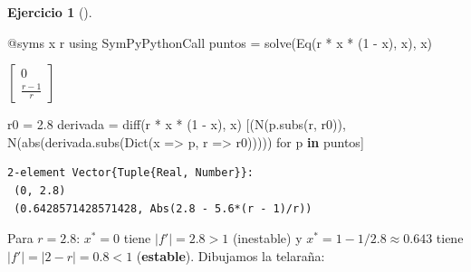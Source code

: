 \documentclass[
  spanish,
  a4paper,
]{scrreport}
\newenvironment{Shaded}{\begin{snugshade}}{\end{snugshade}}
\newcommand{\BuiltInTok}[1]{\textcolor[rgb]{0.00,0.23,0.31}{#1}}
\newcommand{\FloatTok}[1]{\textcolor[rgb]{0.68,0.00,0.00}{#1}}
\newcommand{\FunctionTok}[1]{\textcolor[rgb]{0.28,0.35,0.67}{#1}}
\newcommand{\ImportTok}[1]{\textcolor[rgb]{0.00,0.46,0.62}{#1}}
\newcommand{\KeywordTok}[1]{\textcolor[rgb]{0.00,0.23,0.31}{\textbf{#1}}}
\newcommand{\NormalTok}[1]{\textcolor[rgb]{0.00,0.23,0.31}{#1}}
\newcommand{\OperatorTok}[1]{\textcolor[rgb]{0.37,0.37,0.37}{#1}}
\newcommand{\PreprocessorTok}[1]{\textcolor[rgb]{0.68,0.00,0.00}{#1}}
\theoremstyle{definition}
\newtheorem{exercise}{Ejercicio}[chapter]
\theoremstyle{remark}
\begin{document}
\begin{exercise}[]
\begin{enumerate}
\begin{tcolorbox}
\begin{Shaded}
\begin{Highlighting}[]
\PreprocessorTok{@syms}\NormalTok{ x r}
\ImportTok{using} \BuiltInTok{SymPyPythonCall}
\NormalTok{puntos }\OperatorTok{=} \FunctionTok{solve}\NormalTok{(}\FunctionTok{Eq}\NormalTok{(r }\OperatorTok{*}\NormalTok{ x }\OperatorTok{*}\NormalTok{ (}\FloatTok{1} \OperatorTok{{-}}\NormalTok{ x), x), x)}
\end{Highlighting}
\end{Shaded}

  $\left[\begin{smallmatrix}0\\\frac{r - 1}{r}\end{smallmatrix}\right]$

\begin{Shaded}
\begin{Highlighting}[]
\NormalTok{r0 }\OperatorTok{=} \FloatTok{2.8}
\NormalTok{derivada }\OperatorTok{=} \FunctionTok{diff}\NormalTok{(r }\OperatorTok{*}\NormalTok{ x }\OperatorTok{*}\NormalTok{ (}\FloatTok{1} \OperatorTok{{-}}\NormalTok{ x), x)}
\NormalTok{[(}\FunctionTok{N}\NormalTok{(p.}\FunctionTok{subs}\NormalTok{(r, r0)), }\FunctionTok{N}\NormalTok{(}\FunctionTok{abs}\NormalTok{(derivada.}\FunctionTok{subs}\NormalTok{(}\FunctionTok{Dict}\NormalTok{(x }\OperatorTok{=\textgreater{}}\NormalTok{ p, r }\OperatorTok{=\textgreater{}}\NormalTok{ r0))))) for p }\KeywordTok{in}\NormalTok{ puntos]}
\end{Highlighting}
\end{Shaded}

\begin{verbatim}
2-element Vector{Tuple{Real, Number}}:
 (0, 2.8)
 (0.6428571428571428, Abs(2.8 - 5.6*(r - 1)/r))
\end{verbatim}

  Para \(r=2.8\): \(x^*=0\) tiene \(|f'|=2.8>1\) (inestable) y
  \(x^*=1-1/2.8\approx 0.643\) tiene \(|f'|=|2-r|=0.8<1\)
  (\textbf{estable}). Dibujamos la telaraña:


\end{tcolorbox}
\end{enumerate}
\end{exercise}
\end{document}
